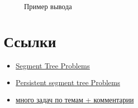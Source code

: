 {\begin{center}
	\begin{figure}[h]
		\captionsetup{font=small, labelformat=empty}
		\caption{Пример вывода}
		\label{fig:image}
	\end{figure}
\end{center}

\pagebreak

\section{Ссылки}




\begin{itemize}
	
	\item \href{https://codeforces.com/blog/entry/22616}{Segment Tree Problems}
	
	\item \href{https://codeforces.com/blog/entry/56880}{Persistent segment tree Problems}
	
	\item \href{https://codeforces.com/blog/entry/55274}{много задач по темам + комментарии}
	

\end{itemize}}
